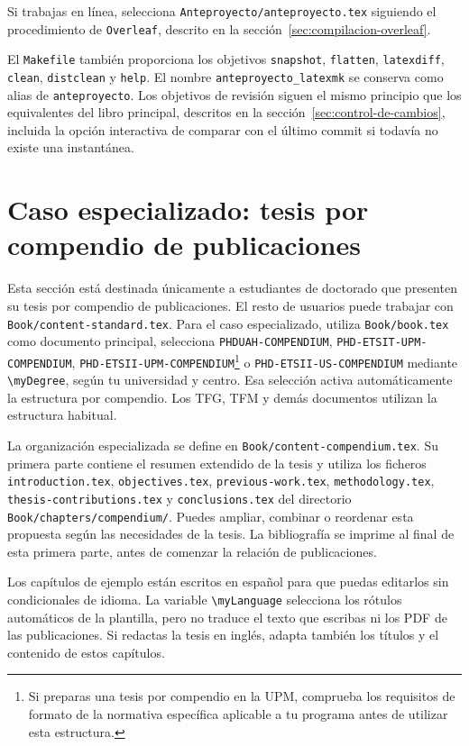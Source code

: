 Si trabajas en línea, selecciona \texttt{Anteproyecto/anteproyecto.tex} siguiendo el procedimiento de \texttt{Overleaf}, descrito en la sección~\ref{sec:compilacion-overleaf}.

El \texttt{Makefile} también proporciona los objetivos \texttt{snapshot}, \texttt{flatten}, \texttt{latexdiff}, \texttt{clean}, \texttt{distclean} y \texttt{help}. El nombre \texttt{anteproyecto\_latexmk} se conserva como alias de \texttt{anteproyecto}. Los objetivos de revisión siguen el mismo principio que los equivalentes del libro principal, descritos en la sección~\ref{sec:control-de-cambios}, incluida la opción interactiva de comparar con el último commit si todavía no existe una instantánea.

\section{Caso especializado: tesis por compendio de publicaciones}
\label{sec:tesis-compendio}

Esta sección está destinada únicamente a estudiantes de doctorado que presenten su tesis por compendio de publicaciones. El resto de usuarios puede trabajar con \texttt{Book/content-standard.tex}. Para el caso especializado, utiliza \texttt{Book/book.tex} como documento principal, selecciona \texttt{PHDUAH-COMPENDIUM}, \texttt{PHD-ETSIT-UPM-COMPENDIUM}, \texttt{PHD-ETSII-UPM-COMPENDIUM}\footnote{Si preparas una tesis por compendio en la UPM, comprueba los requisitos de formato de la normativa específica aplicable a tu programa antes de utilizar esta estructura.} o \texttt{PHD-ETSII-US-COMPENDIUM} mediante \texttt{\textbackslash{}myDegree}, según tu universidad y centro. Esa selección activa automáticamente la estructura por compendio. Los TFG, TFM y demás documentos utilizan la estructura habitual.

La organización especializada se define en \texttt{Book/content-compendium.tex}. Su primera parte contiene el resumen extendido de la tesis y utiliza los ficheros \texttt{introduction.tex}, \texttt{objectives.tex}, \texttt{previous-work.tex}, \texttt{methodology.tex}, \texttt{thesis-contributions.tex} y \texttt{conclusions.tex} del directorio \texttt{Book/chapters/compendium/}. Puedes ampliar, combinar o reordenar esta propuesta según las necesidades de la tesis. La bibliografía se imprime al final de esta primera parte, antes de comenzar la relación de publicaciones.

Los capítulos de ejemplo están escritos en español para que puedas editarlos sin condicionales de idioma. La variable \texttt{\textbackslash{}myLanguage} selecciona los rótulos automáticos de la plantilla, pero no traduce el texto que escribas ni los PDF de las publicaciones. Si redactas la tesis en inglés, adapta también los títulos y el contenido de estos capítulos.

